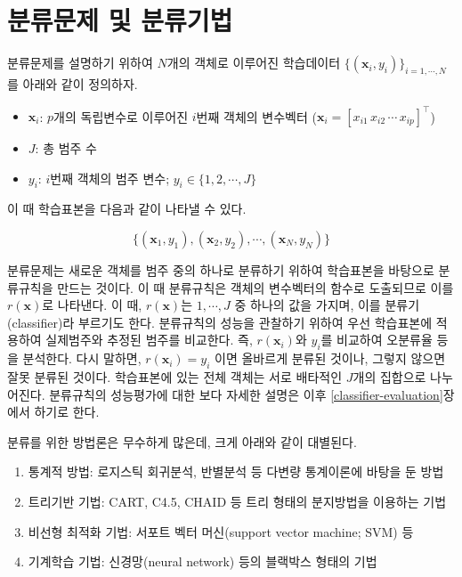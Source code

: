 \documentclass[]{book}
\providecommand{\tightlist}{%
  \setlength{\itemsep}{0pt}\setlength{\parskip}{0pt}}
\begin{document}
\hypertarget{classification-problem-methods}{%
\section{분류문제 및 분류기법}\label{classification-problem-methods}}

분류문제를 설명하기 위하여 \(N\)개의 객체로 이루어진 학습데이터 \(\{(\mathbf{x}_i, y_i)\}_{i = 1, \cdots, N}\)를 아래와 같이 정의하자.

\begin{itemize}
\tightlist
\item
  \(\mathbf{x}_i\): \(p\)개의 독립변수로 이루어진 \(i\)번째 객체의 변수벡터 (\(\mathbf{x}_i = [x_{i1} \, x_{i2} \, \cdots \, x_{ip}]^\top\))
\item
  \(J\): 총 범주 수
\item
  \(y_i\): \(i\)번째 객체의 범주 변수; \(y_i \in \{1, 2, \cdots, J\}\)
\end{itemize}

이 때 학습표본을 다음과 같이 나타낼 수 있다.

\begin{equation*}
\{(\mathbf{x}_1, y_1), (\mathbf{x}_2, y_2), \cdots, (\mathbf{x}_N, y_N)\}
\end{equation*}

분류문제는 새로운 객체를 범주 중의 하나로 분류하기 위하여 학습표본을 바탕으로 분류규칙을 만드는 것이다. 이 때 분류규칙은 객체의 변수벡터의 함수로 도출되므로 이를 \(r(\mathbf{x})\)로 나타낸다. 이 때, \(r(\mathbf{x})\)는 \(1, \cdots, J\) 중 하나의 값을 가지며, 이를 분류기(classifier)라 부르기도 한다. 분류규칙의 성능을 관찰하기 위하여 우선 학습표본에 적용하여 실제범주와 추정된 범주를 비교한다. 즉, \(r(\mathbf{x}_i)\)와 \(y_i\)를 비교하여 오분류율 등을 분석한다. 다시 말하면, \(r(\mathbf{x}_i) = y_i\) 이면 올바르게 분류된 것이나, 그렇지 않으면 잘못 분류된 것이다. 학습표본에 있는 전체 객체는 서로 배타적인 \(J\)개의 집합으로 나누어진다. 분류규칙의 성능평가에 대한 보다 자세한 설명은 이후 \ref{classifier-evaluation}장에서 하기로 한다.

분류를 위한 방법론은 무수하게 많은데, 크게 아래와 같이 대별된다.

\begin{enumerate}
\def\labelenumi{\arabic{enumi}.}
\tightlist
\item
  통계적 방법: 로지스틱 회귀분석, 반별분석 등 다변량 통계이론에 바탕을 둔 방법
\item
  트리기반 기법: CART, C4.5, CHAID 등 트리 형태의 분지방법을 이용하는 기법
\item
  비선형 최적화 기법: 서포트 벡터 머신(support vector machine; SVM) 등
\item
  기계학습 기법: 신경망(neural network) 등의 블랙박스 형태의 기법
\end{enumerate}
\end{document}
